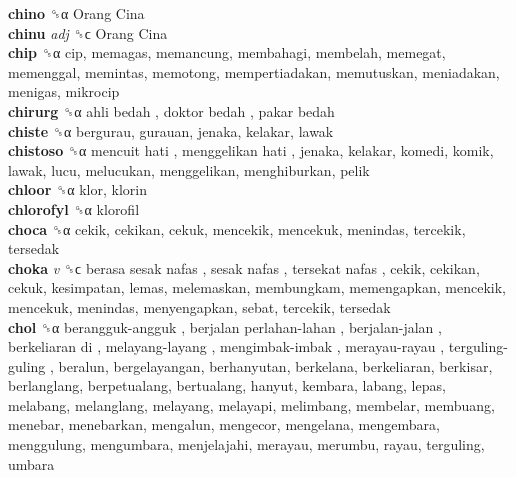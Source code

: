 \textbf{chino} ␝α   Orang Cina   \\
\textbf{chinu} \emph{adj}  ␝ϲ   Orang Cina   \\
\textbf{chip} ␝α  cip, memagas, memancung, membahagi, membelah, memegat, memenggal, memintas, memotong, mempertiadakan, memutuskan, meniadakan, menigas, mikrocip  \\
\textbf{chirurg} ␝α   ahli bedah ,  doktor bedah ,  pakar bedah   \\
\textbf{chiste} ␝α  bergurau, gurauan, jenaka, kelakar, lawak  \\
\textbf{chistoso} ␝α   mencuit hati ,  menggelikan hati , jenaka, kelakar, komedi, komik, lawak, lucu, melucukan, menggelikan, menghiburkan, pelik  \\
\textbf{chloor} ␝α  klor, klorin  \\
\textbf{chlorofyl} ␝α  klorofil  \\
\textbf{choca} ␝α  cekik, cekikan, cekuk, mencekik, mencekuk, menindas, tercekik, tersedak  \\
\textbf{choka} \emph{v}  ␝ϲ   berasa sesak nafas ,  sesak nafas ,  tersekat nafas , cekik, cekikan, cekuk, kesimpatan, lemas, melemaskan, membungkam, memengapkan, mencekik, mencekuk, menindas, menyengapkan, sebat, tercekik, tersedak  \\
\textbf{chol} ␝α   berangguk-angguk ,  berjalan perlahan-lahan ,  berjalan-jalan ,  berkeliaran di ,  melayang-layang ,  mengimbak-imbak ,  merayau-rayau ,  terguling-guling , beralun, bergelayangan, berhanyutan, berkelana, berkeliaran, berkisar, berlanglang, berpetualang, bertualang, hanyut, kembara, labang, lepas, melabang, melanglang, melayang, melayapi, melimbang, membelar, membuang, menebar, menebarkan, mengalun, mengecor, mengelana, mengembara, menggulung, mengumbara, menjelajahi, merayau, merumbu, rayau, terguling, umbara  \\
